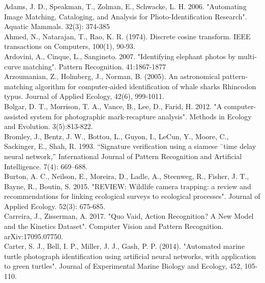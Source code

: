 \documentclass[11pt]{article}
\begin{document}
Adams, J. D., Speakman, T., Zolman, E., Schwacke, L. H. 2006. "Automating Image Matching, Cataloging, and Analysis for Photo-Identification Research". Aquatic Mammals. 32(3): 374-385
\newline
\\
Ahmed, N., Natarajan, T., Rao, K. R. (1974). Discrete cosine transform. IEEE transactions on Computers, 100(1), 90-93.
\newline
\\
Ardovini, A., Cinque, L., Sangineto. 2007. "Identifying elephant photos by multi-curve matching". Pattern Recognition. 41:1867-1877
\newline
\\
Arzoumanian, Z., Holmberg, J., Norman, B. (2005). An astronomical pattern‐matching algorithm for computer‐aided identification of whale sharks Rhincodon typus. Journal of Applied Ecology, 42(6), 999-1011.
\newline
\\
Bolgar, D. T., Morrison, T. A., Vance, B., Lee, D., Farid, H. 2012. "A computer-assisted system for photographic mark-recapture analysis". Methods in Ecology and Evolution. 3(5):813-822.
\newline
\\
Bromley, J., Bentz, J. W., Bottou, L., Guyon, I., LeCun, Y., Moore, C., Sackinger, E., Shah, R. 1993. “Signature verification using a siamese ¨time delay neural network,” International Journal of Pattern Recognition and Artificial Intelligence. 7(4): 669–688.
\newline
\\
Burton, A. C., Neilson, E., Moreira, D., Ladle, A., Steenweg, R., Fisher, J. T., Bayne, R., Boutin, S. 2015. "REVIEW: Wildlife camera trapping: a review and recommendations for linking ecological surveys to ecological processes". Journal of Applied Ecology. 52(3): 675-685.
\newline
\\
Carreira, J., Zisserman, A. 2017. "Quo Vaid, Action Recognition? A New Model and the Kinetics Dataset". Computer Vision and Pattern Recognition. arXiv:17095.07750.
\newline
\\
Carter, S. J., Bell, I. P., Miller, J. J., Gash, P. P. (2014). "Automated marine turtle photograph identification using artificial neural networks, with application to green turtles". Journal of Experimental Marine Biology and Ecology, 452, 105-110.
\newline
\\
\end{document}
